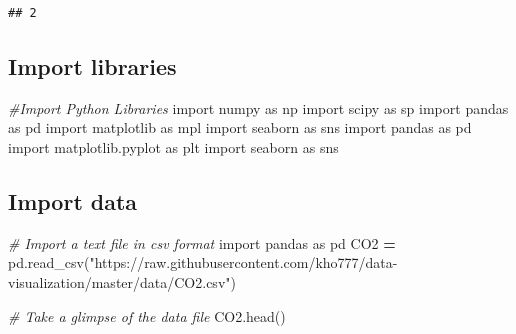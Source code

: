 \documentclass[]{book}
\newenvironment{Shaded}{\begin{snugshade}}{\end{snugshade}}
\newcommand{\CommentTok}[1]{\textcolor[rgb]{0.56,0.35,0.01}{\textit{#1}}}
\newcommand{\ImportTok}[1]{#1}
\newcommand{\NormalTok}[1]{#1}
\newcommand{\OperatorTok}[1]{\textcolor[rgb]{0.81,0.36,0.00}{\textbf{#1}}}
\newcommand{\StringTok}[1]{\textcolor[rgb]{0.31,0.60,0.02}{#1}}
\begin{document}
\begin{Shaded}
\end{Shaded}

\begin{verbatim}
## 2
\end{verbatim}

\hypertarget{import-libraries}{%
\subsection{Import libraries}\label{import-libraries}}

\begin{Shaded}
\begin{Highlighting}[]
\CommentTok{#Import Python Libraries}
\ImportTok{import}\NormalTok{ numpy }\ImportTok{as}\NormalTok{ np}
\ImportTok{import}\NormalTok{ scipy }\ImportTok{as}\NormalTok{ sp}
\ImportTok{import}\NormalTok{ pandas }\ImportTok{as}\NormalTok{ pd}
\ImportTok{import}\NormalTok{ matplotlib }\ImportTok{as}\NormalTok{ mpl}
\ImportTok{import}\NormalTok{ seaborn }\ImportTok{as}\NormalTok{ sns}
\ImportTok{import}\NormalTok{ pandas }\ImportTok{as}\NormalTok{ pd}
\ImportTok{import}\NormalTok{ matplotlib.pyplot }\ImportTok{as}\NormalTok{ plt}
\ImportTok{import}\NormalTok{ seaborn }\ImportTok{as}\NormalTok{ sns}
\end{Highlighting}
\end{Shaded}

\hypertarget{import-data}{%
\subsection{Import data}\label{import-data}}

\begin{Shaded}
\begin{Highlighting}[]

\CommentTok{# Import a text file in csv format}
\ImportTok{import}\NormalTok{ pandas }\ImportTok{as}\NormalTok{ pd}
\NormalTok{CO2 }\OperatorTok{=}\NormalTok{ pd.read_csv(}\StringTok{"https://raw.githubusercontent.com/kho777/data-visualization/master/data/CO2.csv"}\NormalTok{)}

\CommentTok{# Take a glimpse of the data file}
\NormalTok{CO2.head()}
\end{Highlighting}
\end{Shaded}
\end{document}
